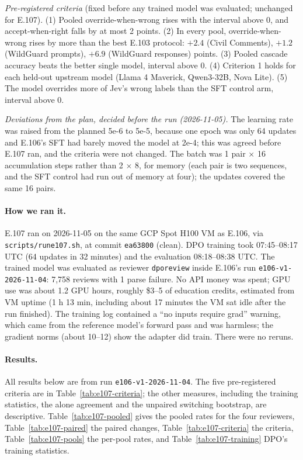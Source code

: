 \documentclass[11pt]{article}
\renewcommand{\_}{\origunderscore\allowbreak}
\begin{document}
\emph{Pre-registered criteria} (fixed before any trained model was evaluated; unchanged for E.107). (1) Pooled override-when-wrong rises with the interval above 0, and accept-when-right falls by at most 2 points. (2) In every pool, override-when-wrong rises by more than the best E.103 protocol: $+2.4$ (Civil Comments), $+1.2$ (WildGuard prompts), $+6.9$ (WildGuard responses) points. (3) Pooled cascade accuracy beats the better single model, interval above 0. (4) Criterion 1 holds for each held-out upstream model (Llama 4 Maverick, Qwen3-32B, Nova Lite). (5) The model overrides more of Jev's wrong labels than the SFT control arm, interval above 0.

\emph{Deviations from the plan, decided before the run (2026-11-05).} The learning rate was raised from the planned 5e-6 to 5e-5, because one epoch was only 64 updates and E.106's SFT had barely moved the model at 2e-4; this was agreed before E.107 ran, and the criteria were not changed. The batch was 1 pair $\times$ 16 accumulation steps rather than 2 $\times$ 8, for memory (each pair is two sequences, and the SFT control had run out of memory at four); the updates covered the same 16 pairs.

\paragraph{How we ran it.}
E.107 ran on 2026-11-05 on the same GCP Spot H100 VM as E.106, via \texttt{scripts/}\allowbreak\texttt{run\_e107.sh}, at commit \texttt{ea63800} (clean). DPO training took 07:45--08:17 UTC (64 updates in 32 minutes) and the evaluation 08:18--08:38 UTC. The trained model was evaluated as reviewer \texttt{dpo\_review} inside E.106's run \texttt{e106-v1-2026-11-04}: 7{,}758 reviews with 1 parse failure. No API money was spent; GPU use was about 1.2 GPU hours, roughly \$3--5 of education credits, estimated from VM uptime (1 h 13 min, including about 17 minutes the VM sat idle after the run finished). The training log contained a ``no inputs require grad'' warning, which came from the reference model's forward pass and was harmless; the gradient norms (about 10--12) show the adapter did train. There were no reruns.

\paragraph{Results.}
All results below are from run \texttt{e106-v1-2026-11-04}. The five pre-registered criteria are in Table~\ref{tab:e107-criteria}; the other measures, including the training statistics, the alone agreement and the unpaired switching bootstrap, are descriptive. Table~\ref{tab:e107-pooled} gives the pooled rates for the four reviewers, Table~\ref{tab:e107-paired} the paired changes, Table~\ref{tab:e107-criteria} the criteria, Table~\ref{tab:e107-pools} the per-pool rates, and Table~\ref{tab:e107-training} DPO's training statistics.
\end{document}
